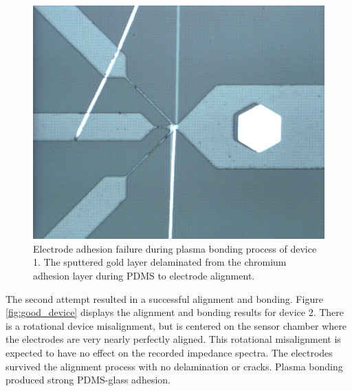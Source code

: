 \begin{figure}[h]
    \centering
    \includegraphics[width=\textwidth]{images/bad_device.png}
    \caption{Electrode adhesion failure during plasma bonding process of device 1. The sputtered gold layer delaminated from the chromium adhesion layer during PDMS to electrode alignment.}
    \label{fig:bad_device}
\end{figure}

\par The second attempt resulted in a successful alignment and bonding. Figure \ref{fig:good_device} displays the alignment and bonding results for device 2. There is a rotational device misalignment, but is centered on the sensor chamber where the electrodes are very nearly perfectly aligned. This rotational misalignment is expected to have no effect on the recorded impedance spectra. The electrodes survived the alignment process with no delamination or cracks. Plasma bonding produced  strong PDMS-glass adhesion. 

